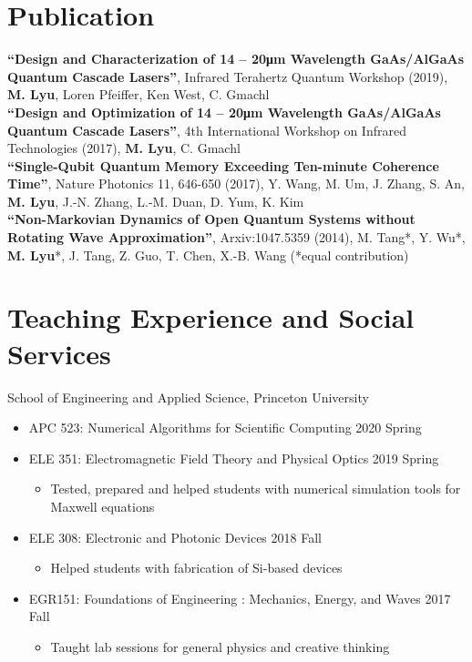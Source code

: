 \documentclass[11pt,letterpaper]{resume}
\begin{document}
\section{Publication}
\textbf{``Design and Characterization of 14 -- 20\si{\micro m} Wavelength 
GaAs/AlGaAs Quantum Cascade Lasers''}, 
Infrared Terahertz Quantum Workshop (2019), 
\textbf{M. Lyu}, Loren Pfeiffer, Ken West, C. Gmachl \\
\textbf{``Design and Optimization of 14 -- 20\si{\micro m} Wavelength 
GaAs/AlGaAs Quantum Cascade Lasers''}, 
4th International Workshop on Infrared Technologies (2017), 
\textbf{M. Lyu}, C. Gmachl \\
\textbf{``Single-Qubit Quantum Memory Exceeding Ten-minute Coherence Time''}, 
Nature Photonics 11, 646-650 (2017), Y. Wang, M. Um, J. Zhang, S. An, 
\textbf{M. Lyu}, J.-N. Zhang, L.-M. Duan, D. Yum, K. Kim \\
\textbf{``Non-Markovian Dynamics of Open Quantum Systems without Rotating 
Wave Approximation''}, 
Arxiv:1047.5359 (2014), 
M. Tang*, Y. Wu*, \textbf{M. Lyu}*, J. Tang, Z. Guo, T. Chen, X.-B. Wang  
(*equal contribution)

\section{Teaching Experience and Social Services}
School of Engineering and Applied Science, Princeton University
\begin{itemize}
    \item APC 523: Numerical Algorithms for Scientific Computing
    \hfill 2020 Spring
    \item ELE 351: Electromagnetic Field Theory and Physical Optics
    \hfill 2019 Spring
    \begin{itemize}
        \item Tested, prepared and helped students with 
        numerical simulation tools for Maxwell equations
    \end{itemize}
    \item ELE 308: Electronic and Photonic Devices
    \hfill 2018 Fall
    \begin{itemize}
        \item Helped students with fabrication of Si-based devices
    \end{itemize}
    \item EGR151: Foundations of Engineering : Mechanics, Energy, and Waves
    \hfill 2017 Fall
    \begin{itemize}
        \item Taught lab sessions for general physics and creative thinking
    \end{itemize}
\end{itemize}\medskip
\end{document}
